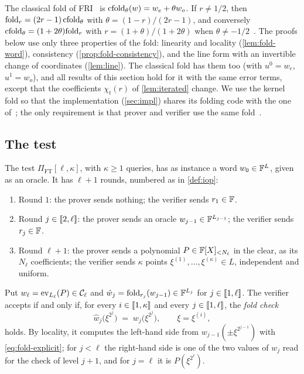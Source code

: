 \begin{remark}\label{rem:cfold}
The classical fold of FRI~\cite{BBHR18} is $\mathrm{cfold}_\theta(w) = w_e + \theta w_o$. If $r \ne 1/2$, then $\mathrm{fold}_r = (2r-1)\,\mathrm{cfold}_\theta$ with $\theta = (1-r)/(2r-1)$, and conversely $\mathrm{cfold}_\theta = (1+2\theta)\mathrm{fold}_{r}$ with $r = (1+\theta)/(1+2\theta)$ when $\theta \ne -1/2$~\cite[Prop.~5.11]{Mkh26}.
The proofs below use only three properties of the fold: linearity and locality (\cref{lem:fold-word}), consistency (\cref{prop:fold-consistency}), and the line form with an invertible change of coordinates (\cref{lem:line}).
The classical fold has them too (with $u^0 = w_e$, $u^1 = w_o$), and all results of this section hold for it with the same error terms, except that the coefficients $\chi_t(r)$ of \cref{lem:iterated} change.
We use the kernel fold so that the implementation (\cref{sec:impl}) shares its folding code with the one of~\cite{Mkh26}; the only requirement is that prover and verifier use the same fold~\cite[Rem.~5.12]{Mkh26}.
\end{remark}

\subsection{The test}\label{sec:fold:test}

\begin{definition}\label{def:fpt}
The test $\Pi_{\mathrm{FT}}[\ell,\kappa]$, with $\kappa \ge 1$ queries, has as instance a word $w_0 \in \mathbb{F}^{L}$, given as an oracle. It has $\ell+1$ rounds, numbered as in \cref{def:iop}:
\begin{enumerate}
  \item Round $1$: the prover sends nothing; the verifier sends $r_1 \in \mathbb{F}$.
  \item Round $j \in \llbracket 2, \ell \rrbracket$: the prover sends an oracle $w_{j-1} \in \mathbb{F}^{L_{j-1}}$; the verifier sends $r_j \in \mathbb{F}$.
  \item Round $\ell+1$: the prover sends a polynomial $P \in \mathbb{F}[X]_{<N_\ell}$ in the clear, as its $N_\ell$ coefficients; the verifier sends $\kappa$ points $\xi^{(1)},\dots,\xi^{(\kappa)} \in L$, independent and uniform.
\end{enumerate}
Put $w_\ell = \mathrm{ev}_{L_\ell}(P) \in \mathcal{C}_\ell$ and $\hat w_j = \mathrm{fold}_{r_j}(w_{j-1}) \in \mathbb{F}^{L_j}$ for $j \in \llbracket 1, \ell \rrbracket$.
The verifier accepts if and only if, for every $i \in \llbracket 1, \kappa \rrbracket$ and every $j \in \llbracket 1, \ell \rrbracket$, the \emph{fold check}
\begin{equation}\label{eq:fold-check}
  \hat w_j\bigl(\xi^{2^j}\bigr) \;=\; w_j\bigl(\xi^{2^j}\bigr), \qquad \xi = \xi^{(i)},
\end{equation}
holds. By locality, it computes the left-hand side from $w_{j-1}(\pm\xi^{2^{j-1}})$ with \eqref{eq:fold-explicit}; for $j < \ell$ the right-hand side is one of the two values of $w_j$ read for the check of level $j+1$, and for $j = \ell$ it is $P(\xi^{2^\ell})$.
\end{definition}

